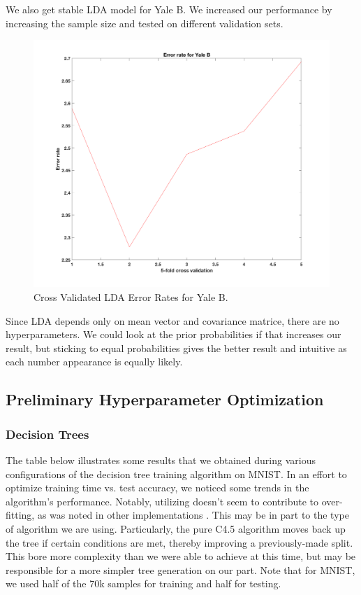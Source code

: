 We also get stable LDA model for Yale B. We increased our performance by increasing the sample size and tested on different validation sets. 
\begin{figure}[H]
	\centering\includegraphics[width=0.6\columnwidth]{../images/cr-err-yale}
	\caption{Cross Validated LDA Error Rates for Yale B.}
\end{figure}

Since LDA depends only on mean vector and covariance matrice, there are no hyperparameters. We could look at the prior probabilities if that increases our result, but sticking to equal probabilities gives the better result and intuitive as each number appearance is equally likely. 


\iffalse
\subsection{Preliminary Hyperparameter Optimization}

\subsubsection{Decision Trees}

The table below illustrates some results that we obtained during various configurations of the decision tree training algorithm on MNIST. In an effort to optimize training time vs. test accuracy, we noticed some trends in the algorithm's performance. Notably, utilizing  doesn't seem to contribute to over-fitting, as was noted in other implementations \cite{matlab:fitctree}. This may be in part to the type of algorithm we are using. Particularly, the pure C4.5 algorithm moves back up the tree if certain conditions are met, thereby improving a previously-made split. This bore more complexity than we were able to achieve at this time, but may be responsible for a more simpler tree generation on our part. Note that for MNIST, we used half of the 70k samples for training and half for testing.

